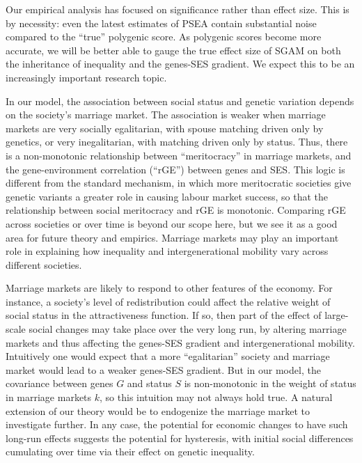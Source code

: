 \documentclass[
]{article}
\begin{document}
Our empirical analysis has focused on significance rather than effect size. This
is by necessity: even the latest estimates of PSEA contain substantial noise
compared to the ``true'' polygenic score. As polygenic scores become more accurate,
we will be better able to gauge the true effect size of SGAM on both the
inheritance of inequality and the genes-SES gradient. We expect this to be
an increasingly important research topic.

In our model, the association between social status and genetic variation
depends on the society's marriage market. The association is weaker when
marriage markets are very socially egalitarian, with spouse matching driven only
by genetics, or very inegalitarian, with matching driven only by status. Thus,
there is a non-monotonic relationship between ``meritocracy'' in marriage markets,
and the gene-environment correlation (``rGE'') between genes and SES. This logic
is different from the standard mechanism, in which more meritocratic societies
give genetic variants a greater role in causing labour market success, so that
the relationship between social meritocracy and rGE is monotonic. Comparing rGE
across societies or over time is beyond our scope here, but we see it as a good
area for future theory and empirics. Marriage markets may play an important role
in explaining how inequality and intergenerational mobility vary across
different societies.

Marriage markets are likely to respond to other features of the economy. For
instance, a society's level of redistribution could affect the relative weight
of social status in the attractiveness function. If so, then part of the effect
of large-scale social changes may take place over the very long run, by altering
marriage markets and thus affecting the genes-SES gradient and intergenerational
mobility. Intuitively one would expect that a more ``egalitarian'' society and
marriage market would lead to a weaker genes-SES gradient. But in our model, the
covariance between genes \(G\) and status \(S\) is non-monotonic in the weight of
status in marriage markets \(k\), so this intuition may not always hold true. A
natural extension of our theory would be to endogenize the marriage market to
investigate further. In any case, the potential for economic changes to have
such long-run effects suggests the potential for hysteresis, with initial social
differences cumulating over time via their effect on genetic inequality.
\end{document}

